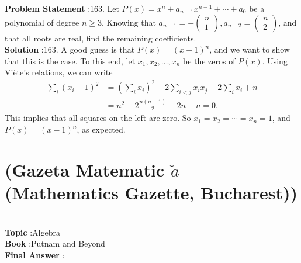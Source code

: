 \documentclass[10pt]{article}
\begin{document}
\textbf{Problem Statement} :163. Let $P(x)=x^{n}+a_{n-1} x^{n-1}+\cdots+a_{0}$ be a polynomial of degree $n \geq 3$. Knowing that $a_{n-1}=-\left(\begin{array}{c}n \\ 1\end{array}\right), a_{n-2}=\left(\begin{array}{l}n \\ 2\end{array}\right)$, and that all roots are real, find the remaining coefficients.\\
\textbf{Solution} :163. A good guess is that $P(x)=(x-1)^{n}$, and we want to show that this is the case. To this end, let $x_{1}, x_{2}, \ldots, x_{n}$ be the zeros of $P(x)$. Using Viète's relations, we can write$$ \begin{aligned} \sum_{i}\left(x_{i}-1\right)^{2} &=\left(\sum_{i} x_{i}\right)^{2}-2 \sum_{i<j} x_{i} x_{j}-2 \sum_{i} x_{i}+n \\ &=n^{2}-2 \frac{n(n-1)}{2}-2 n+n=0 . \end{aligned} $$This implies that all squares on the left are zero. So $x_{1}=x_{2}=\cdots=x_{n}=1$, and $P(x)=(x-1)^{n}$, as expected.\section{(Gazeta Matematic $\breve{a}$ (Mathematics Gazette, Bucharest))}\\
\textbf{Topic} :Algebra\\
\textbf{Book} :Putnam and Beyond\\
\textbf{Final Answer} :\\
\end{document}
